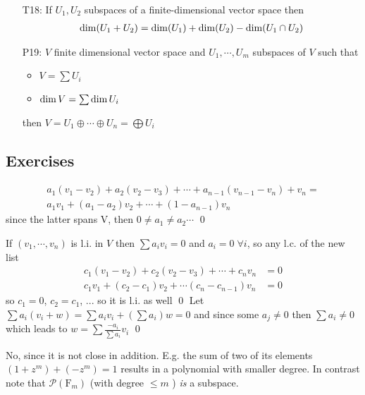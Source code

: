 \begin{itemize}
\begin{itemize}
\end{itemize}
%
\item[T18:\label{it:T2_18}] If $U_1,U_2$ subspaces of a finite-dimensional vector space then 
\begin{align*}
\operatorname{dim}(U_1+U_2)=\operatorname{dim}(U_1)+\operatorname{dim}(U_2) - \operatorname{dim}(U_1\cap U_2)
\end{align*}
\item[P19:\label{it:T2_19}] $V$ finite dimensional vector space and $U_1,\cdots,U_m$ subspaces of $V$ such that 
\begin{itemize}
  \item $V=\sum U_i$
  \item $\operatorname{dim}{V}=\sum\operatorname{dim}{U_i}$
\end{itemize}
 then $V=U_1 \oplus \cdots \oplus U_n = \bigoplus U_i$
\end{itemize}



\subsection*{Exercises}
\exo{}
\begin{align*}
a_1(v_1 - v_2) + a_2 (v_2 - v_3) + \cdots + a_{n-1} (v_{n-1} - v_n) + v_n = \\
a_1 v_1 + (a_1 - a_2) v_2 + \cdots + (1 - a_{n-1}) v_n 
\end{align*}
since the latter spans V, then $0 \neq a_1\neq a_2 \cdots$ 
\qed

\exo{} If $(v_1,\cdots,v_n)$ is l.i. in $V$ then $\sum a_i v_i = 0$ and $a_i = 0\; \forall i$, so any l.c. of the new list 
\begin{align*}
  c_1 (v_1 - v_2) + c_2 (v_2 - v_3) + \cdots + c_n v_n &= 0\\
  c_1 v_1 + (c_2 - c_1) v_2 + \cdots (c_n - c_{n-1})v_n &= 0
\end{align*}
so $c_1=0$, $c_2 = c_1$, ...  so it is l.i. as well \qed
\exo{} Let $\sum a_i (v_i + w) = \sum a_i v_i + (\sum a_i) w = 0$ and since some $a_j\neq 0$ then $\sum a_i\neq 0$ 
which leads to $w = \sum \frac{-a_i}{\sum a_i} v_i$ \qed 

\exo{} No, since it is not close in addition. E.g. the sum of two of its elements $ (1 + z^m) + (- z^m) = 1  $ 
results in a polynomial with smaller degree. In contrast note that $\mathcal{P}(\mathrm{F}_m)$ (with degree $\leq m$ ) 
\emph{is} a subspace. 

